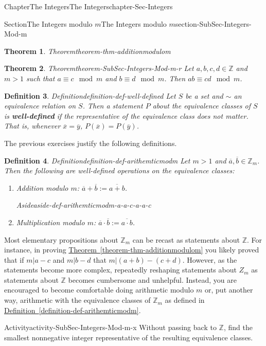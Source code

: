 \documentclass[oneside,10pt,]{book}
\newcommand{\xreffont}{\relax}
\newcommand{\terminology}[1]{\textbf{#1}}
\numberwithin{equation}{section}
\def\Z{{\mathbb Z}}
\newtheorem{theorem}{Theorem}[section]
\newtheorem{definition}[theorem]{Definition}
\begin{document}
\begin{chapterptx}{Chapter}{The Integers}{}{The Integers}{}{}{chapter-Sec-Integers}
\begin{sectionptx}{Section}{The Integers modulo \(m\)}{}{The Integers modulo \(m\)}{}{}{section-SubSec-Integers-Mod-m}
\begin{theorem}{Theorem}{}{}{theorem-thm-additionmodulom}
\end{theorem}
\begin{theorem}{Theorem}{}{}{theorem-SubSec-Integers-Mod-m-r}%
Let \(a,b, c,d\in \Z\) and \(m > 1\) such that \(a\equiv c\mod m\) and \(b\equiv d\mod m\). Then \(ab \equiv c d\mod m\).%
\end{theorem}
\begin{definition}{Definition}{}{definition-def-well-defined}%
%
Let \(S\) be a set and \(\sim\) an equivalence relation on \(S\). Then a statement \(P\) about the equivalence classes of \(S\) is \terminology{well-defined} if the representative of the equivalence class does not matter. That is, whenever \(\overline{x} = \overline{y}\), \(P(\overline{x}) = P(\overline{y})\).%
\end{definition}
The previous exercises justify the following definitions.%
\begin{definition}{Definition}{}{definition-def-arithemticmodm}%
Let \(m > 1\) and \(\overline{a},\overline{b}\in \Z_m\). Then the following are well-defined operations on the equivalence classes:%
\begin{enumerate}
\item{}\emph{Addition modulo \(m\)}: \(\overline{a} + \overline{b} := \overline{a+b}\). \begin{aside}{Aside}{}{aside-def-arithemticmodm-a-a-c-a-a-c}%
\end{aside}
%
\item{}\emph{Multiplication modulo \(m\)}: \(\overline{a}\cdot \overline{b} := \overline{a\cdot b}\).%
\end{enumerate}
%
\end{definition}
Most elementary propositions about \(\Z_m\) can be recast as statements about \(\Z\). For instance, in proving \hyperref[theorem-thm-additionmodulom]{Theorem~{\xreffont\ref{theorem-thm-additionmodulom}}} you likely proved that if \(m|a-c\) and \(m|b-d\) that \(m|(a+b)-(c+d)\). However, as the statements become more complex, repeatedly reshaping statements about \(Z_m\) as statements about \(\Z\) becomes cumbersome and unhelpful. Instead, you are encouraged to become comfortable doing arithmetic modulo \(m\) or, put another way, arithmetic with the equivalence classes of \(\Z_m\) as defined in \hyperref[definition-def-arithemticmodm]{Definition~{\xreffont\ref{definition-def-arithemticmodm}}}.%
\begin{activity}{Activity}{}{activity-SubSec-Integers-Mod-m-x}%
Without passing back to \(\Z\), find the smallest nonnegative integer representative of the resulting equivalence classes.%

\end{activity}
\end{sectionptx}
\end{chapterptx}
\end{document}
